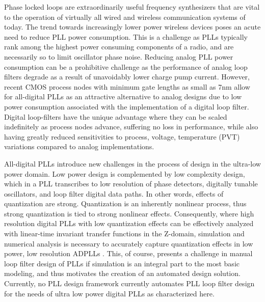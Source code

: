 Phase locked loops are extraordinarily useful frequency synthesizers that are vital to the operation of virtually all wired and wireless communication systems of today. The trend towards increasingly lower power wireless devices poses an acute need to reduce PLL power consumption. This is a challenge as PLLs typically rank among the highest power consuming components of a radio, and are necessarily so to limit oscillator phase noise. Reducing analog PLL power consumption can be a prohibitive challenge as the performance of analog loop filters degrade as a result of unavoidably lower charge pump current. However, recent CMOS process nodes with minimum gate lengths as small as 7nm allow for all-digital PLLs as an attractive alternative to analog designs due to low power consumption associated with the implementation of a digital loop filter. Digital loop-filters have the unique advantage where they can be scaled indefinitely as process nodes advance, suffering no loss in performance, while also having greatly reduced sensitivities to process, voltage, temperature (PVT) variations compared to analog implementations.

All-digital PLLs introduce new challenges in the process of design in the ultra-low power domain. Low power design is complemented by low complexity design, which in a PLL transcribes to low resolution of phase detectors, digitally tunable oscillators, and loop filter digital data paths. In other words, effects of quantization are strong. Quantization is an inherently nonlinear process, thus strong quantization is tied to strong nonlinear effects. Consequently, where high resolution digital PLLs with low quantization effects can be effectively analyzed with linear-time invariant transfer functions in the Z-domain, simulation and numerical analysis is necessary to accurately capture quantization effects in low power, low resolution ADPLLs . This, of course, presents a challenge in manual loop filter design of PLLs if simulation is an integral part to the most basic modeling, and thus motivates the creation of an automated design solution. Currently, no PLL design framework currently automates PLL loop filter design for the needs of ultra low power digital PLLs as characterized here. 

